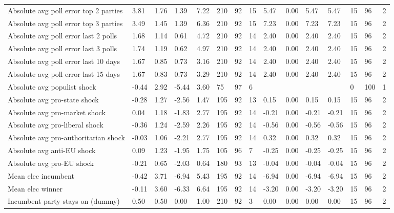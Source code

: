 \begin{longtable}{lllllllllllllll}
Absolute avg poll error top 2 parties & 3.81 & 1.76 & 1.39 & 7.22 & 210 & 92 & 15 & 5.47 & 0.00 & 5.47 & 5.47 & 15 & 96 & 2\\
\addlinespace
Absolute avg poll error top 3 parties & 3.49 & 1.45 & 1.39 & 6.36 & 210 & 92 & 15 & 7.23 & 0.00 & 7.23 & 7.23 & 15 & 96 & 2\\
Absolute avg poll error last 2 polls & 1.68 & 1.14 & 0.61 & 4.72 & 210 & 92 & 14 & 2.40 & 0.00 & 2.40 & 2.40 & 15 & 96 & 2\\
Absolute avg poll error last 3 polls & 1.74 & 1.19 & 0.62 & 4.97 & 210 & 92 & 14 & 2.40 & 0.00 & 2.40 & 2.40 & 15 & 96 & 2\\
Absolute avg poll error last 10 days & 1.67 & 0.85 & 0.73 & 3.16 & 210 & 92 & 14 & 2.40 & 0.00 & 2.40 & 2.40 & 15 & 96 & 2\\
Absolute avg poll error last 15 days & 1.67 & 0.83 & 0.73 & 3.29 & 210 & 92 & 14 & 2.40 & 0.00 & 2.40 & 2.40 & 15 & 96 & 2\\
\addlinespace
Absolute avg populist shock & -0.44 & 2.92 & -5.44 & 3.60 & 75 & 97 & 6 &  &  &  &  & 0 & 100 & 1\\
Absolute avg pro-state shock & -0.28 & 1.27 & -2.56 & 1.47 & 195 & 92 & 13 & 0.15 & 0.00 & 0.15 & 0.15 & 15 & 96 & 2\\
Absolute avg pro-market shock & 0.04 & 1.18 & -1.83 & 2.77 & 195 & 92 & 14 & -0.21 & 0.00 & -0.21 & -0.21 & 15 & 96 & 2\\
Absolute avg pro-liberal shock & -0.36 & 1.24 & -2.59 & 2.26 & 195 & 92 & 14 & -0.56 & 0.00 & -0.56 & -0.56 & 15 & 96 & 2\\
Absolute avg pro-authoritarian shock & -0.03 & 1.06 & -2.21 & 2.77 & 195 & 92 & 14 & 0.32 & 0.00 & 0.32 & 0.32 & 15 & 96 & 2\\
\addlinespace
Absolute avg anti-EU shock & 0.09 & 1.23 & -1.95 & 1.75 & 105 & 96 & 7 & -0.25 & 0.00 & -0.25 & -0.25 & 15 & 96 & 2\\
Absolute avg pro-EU shock & -0.21 & 0.65 & -2.03 & 0.64 & 180 & 93 & 13 & -0.04 & 0.00 & -0.04 & -0.04 & 15 & 96 & 2\\
Mean elec incumbent & -0.42 & 3.71 & -6.94 & 5.43 & 195 & 92 & 14 & -6.94 & 0.00 & -6.94 & -6.94 & 15 & 96 & 2\\
Mean elec winner & -0.11 & 3.60 & -6.33 & 6.64 & 195 & 92 & 14 & -3.20 & 0.00 & -3.20 & -3.20 & 15 & 96 & 2\\
Incumbent party stays on (dummy) & 0.50 & 0.50 & 0.00 & 1.00 & 210 & 92 & 3 & 0.00 & 0.00 & 0.00 & 0.00 & 15 & 96 & 2\\

\end{longtable}
